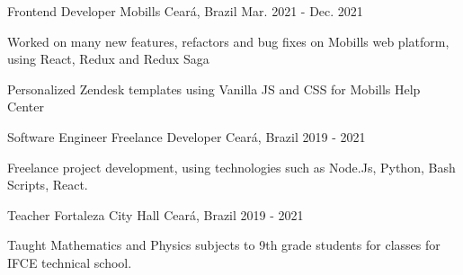 \begin{cventries}
  \cventry
    {Frontend Developer} %
    {Mobills} %
    {Ceará, Brazil} %
    {Mar. 2021 - Dec. 2021} %
    {
      \begin{cvitems} %
        \item {Worked on many new features,
        refactors and bug fixes on Mobills
        web platform, using React, Redux
        and Redux Saga}
        \item {Personalized Zendesk templates
        using Vanilla JS and CSS for
        Mobills Help Center}
      \end{cvitems}
    }

\cventry
{Software Engineer} %
{Freelance Developer} %
{Ceará, Brazil} %
{2019 - 2021} %
{
  \begin{cvitems} %
    \item {Freelance project development, using technologies such as Node.Js, Python, Bash Scripts, React.}
  \end{cvitems}
}

\cventry
{Teacher} %
{Fortaleza City Hall} %
{Ceará, Brazil} %
{2019 - 2021} %
{
  \begin{cvitems} %
    \item {Taught Mathematics and Physics subjects to 9th grade students for classes for IFCE technical school.}
  \end{cvitems}
}

\end{cventries}
